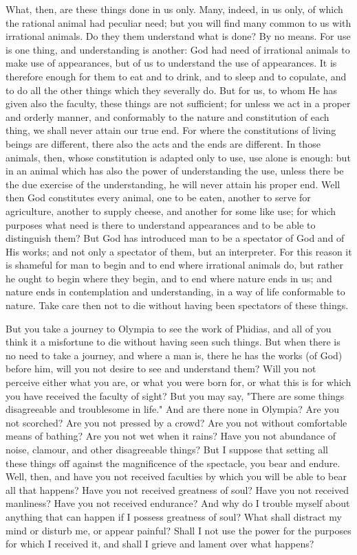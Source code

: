 \documentclass[a4paper]{article}
\begin{document}
What, then, are these things done in us only. Many, indeed, in us
only, of which the rational animal had peculiar need; but you will
find many common to us with irrational animals. Do they them understand
what is done? By no means. For use is one thing, and understanding
is another: God had need of irrational animals to make use of appearances,
but of us to understand the use of appearances. It is therefore enough
for them to eat and to drink, and to sleep and to copulate, and to
do all the other things which they severally do. But for us, to whom
He has given also the faculty, these things are not sufficient; for
unless we act in a proper and orderly manner, and conformably to the
nature and constitution of each thing, we shall never attain our true
end. For where the constitutions of living beings are different, there
also the acts and the ends are different. In those animals, then,
whose constitution is adapted only to use, use alone is enough: but
in an animal which has also the power of understanding the use, unless
there be the due exercise of the understanding, he will never attain
his proper end. Well then God constitutes every animal, one to be
eaten, another to serve for agriculture, another to supply cheese,
and another for some like use; for which purposes what need is there
to understand appearances and to be able to distinguish them? But
God has introduced man to be a spectator of God and of His works;
and not only a spectator of them, but an interpreter. For this reason
it is shameful for man to begin and to end where irrational animals
do, but rather he ought to begin where they begin, and to end where
nature ends in us; and nature ends in contemplation and understanding,
in a way of life conformable to nature. Take care then not to die
without having been spectators of these things. 

But you take a journey to Olympia to see the work of Phidias, and
all of you think it a misfortune to die without having seen such things.
But when there is no need to take a journey, and where a man is, there
he has the works (of God) before him, will you not desire to see and
understand them? Will you not perceive either what you are, or what
you were born for, or what this is for which you have received the
faculty of sight? But you may say, "There are some things disagreeable
and troublesome in life." And are there none in Olympia? Are you not
scorched? Are you not pressed by a crowd? Are you not without comfortable
means of bathing? Are you not wet when it rains? Have you not abundance
of noise, clamour, and other disagreeable things? But I suppose that
setting all these things off against the magnificence of the spectacle,
you bear and endure. Well, then, and have you not received faculties
by which you will be able to bear all that happens? Have you not received
greatness of soul? Have you not received manliness? Have you not received
endurance? And why do I trouble myself about anything that can happen
if I possess greatness of soul? What shall distract my mind or disturb
me, or appear painful? Shall I not use the power for the purposes
for which I received it, and shall I grieve and lament over what happens?
\end{document}
